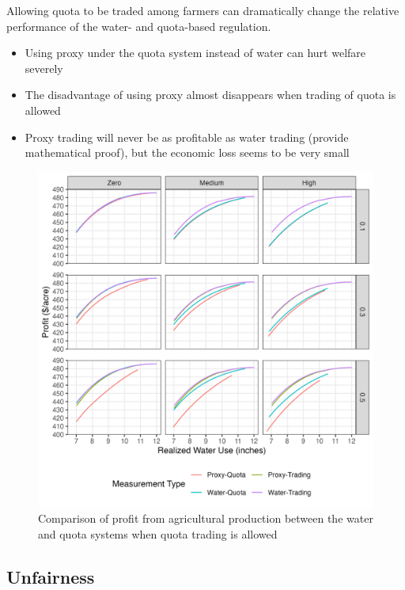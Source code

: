 \documentclass[
]{article}
\providecommand{\tightlist}{%
  \setlength{\itemsep}{0pt}\setlength{\parskip}{0pt}}
\begin{document}
Allowing quota to be traded among farmers can dramatically change the relative performance of the water- and quota-based regulation.

\begin{itemize}
\tightlist
\item
  Using proxy under the quota system instead of water can hurt welfare severely
\item
  The disadvantage of using proxy almost disappears when trading of quota is allowed
\item
  Proxy trading will never be as profitable as water trading (provide mathematical proof), but the economic loss seems to be very small
\end{itemize}

\begin{figure}[H]

{\centering \includegraphics{figures/g_trade_effect_profit} 

}

\caption{Comparison of profit from agricultural production between the water and quota systems when quota trading is allowed}\label{fig:trading-profit}
\end{figure}

\subsection{Unfairness}\label{unfairness}
\end{document}
